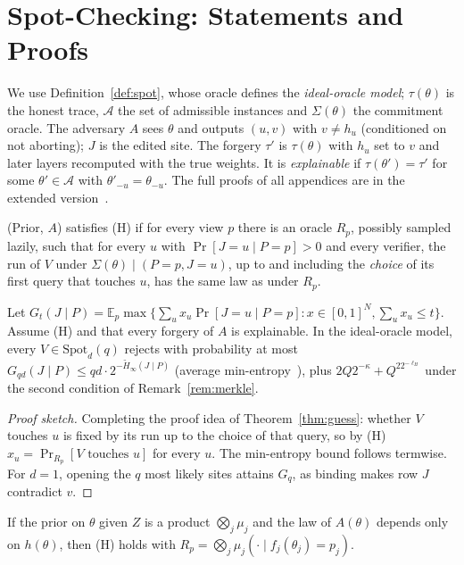 \section{Spot-Checking: Statements and Proofs}
\label{app:attack}

 We use Definition~\ref{def:spot}, whose oracle defines the \emph{ideal-oracle
model}; $\tau(\theta)$ is the honest trace, $\mathcal A$ the set of admissible instances and
$\Sigma(\theta)$ the commitment oracle. The adversary $A$
sees $\theta$ and outputs $(u,v)$ with $v\neq h_u$ (conditioned on not aborting); $J$ is the edited
site. The forgery $\tau'$ is $\tau(\theta)$ with $h_u$ set to $v$ and later layers recomputed
with the true weights. It is \emph{explainable} if $\tau(\theta')=\tau'$ for some
$\theta'\in\mathcal A$ with $\theta'_{-u}=\theta_{-u}$. The full proofs of all appendices are in the
extended version~\cite{fullversion}.

\begin{definition}
\label{def:H}
(Prior, $A$) satisfies (H) if for every view $p$ there is an oracle $R_p$, possibly sampled lazily,
such that for every $u$ with $\Pr[J=u\mid P=p]>0$ and every verifier, the run of $V$ under
$\Sigma(\theta)\mid(P=p,J=u)$, up to and including the \emph{choice} of its first query that
touches $u$, has the same law as under $R_p$.
\end{definition}

\begin{theorem}
\label{thm:guess-full}
Let $G_t(J\mid P)=\mathbb E_p\max\{\sum_ux_u\Pr[J=u\mid P=p]:x\in[0,1]^N,\sum_ux_u\le t\}$. Assume
(H) and that every forgery of $A$ is explainable. In the ideal-oracle model, every
$V\in\mathrm{Spot}_d(q)$ rejects with probability at most $G_{qd}(J\mid P)\le
qd\cdot2^{-\tilde H_\infty(J\mid P)}$ (average min-entropy~\cite{dodis2008fuzzy}), plus
$2Q2^{-\kappa}+Q^22^{-\ell_H}$ under the second condition of Remark~\ref{rem:merkle}.
\end{theorem}
\begin{proof}[Proof sketch]
Completing the proof idea of Theorem~\ref{thm:guess}: whether $V$ touches $u$ is fixed by its
run up to the choice of that query, so by (H) $x_u=\Pr_{R_p}[V\text{ touches }u]$ for every $u$.
The min-entropy bound follows termwise. For $d=1$, opening the $q$ most likely sites attains $G_q$,
as binding makes row $J$ contradict $v$.
\end{proof}

\begin{lemma}
\label{lem:product}
If the prior on $\theta$ given $Z$ is a product $\bigotimes_j\mu_j$ and the law of $A(\theta)$
depends only on $h(\theta)$, then (H) holds with $R_p=\bigotimes_j\mu_j(\cdot\mid f_j(\theta_j)=p_j)$.
\end{lemma}

